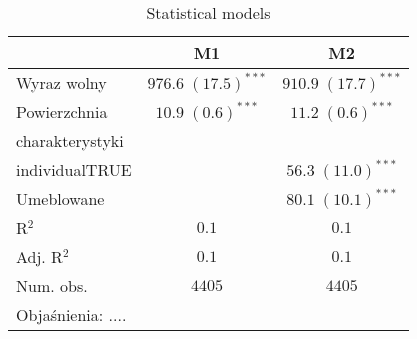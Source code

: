 
\begin{table}
\begin{center}
\begin{tabular}{l c c}
\hline
 & M1 & M2 \\
\hline
Wyraz wolny          & $976.6 \; (17.5)^{***}$ & $910.9 \; (17.7)^{***}$ \\
Powierzchnia         & $10.9 \;  (0.6)^{***}$  & $11.2 \;  (0.6)^{***}$  \\
charakterystyki      &                         &                         \\
\quad individualTRUE &                         & $56.3 \; (11.0)^{***}$  \\
\quad Umeblowane     &                         & $80.1 \; (10.1)^{***}$  \\
\hline
R$^2$                & $0.1$                   & $0.1$                   \\
Adj. R$^2$           & $0.1$                   & $0.1$                   \\
Num. obs.            & $4405$                  & $4405$                  \\
\hline
\multicolumn{3}{l}{\scriptsize{Objaśnienia: ....}}
\end{tabular}
\caption{Statistical models}
\label{table:coefficients}
\end{center}
\end{table}

